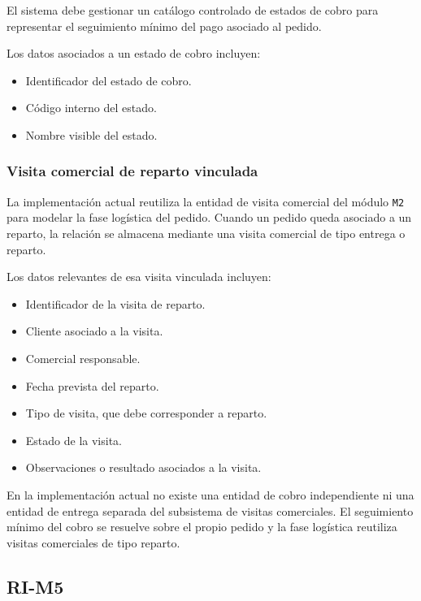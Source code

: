 El sistema debe gestionar un catálogo controlado de estados de cobro para representar el seguimiento mínimo del pago asociado al pedido.

Los datos asociados a un estado de cobro incluyen:

\begin{itemize}
    \item Identificador del estado de cobro.
    \item Código interno del estado.
    \item Nombre visible del estado.
\end{itemize}

\subsubsection*{Visita comercial de reparto vinculada}

La implementación actual reutiliza la entidad de visita comercial del módulo \texttt{M2} para modelar la fase logística del pedido. Cuando un pedido queda asociado a un reparto, la relación se almacena mediante una visita comercial de tipo entrega o reparto.

Los datos relevantes de esa visita vinculada incluyen:

\begin{itemize}
    \item Identificador de la visita de reparto.
    \item Cliente asociado a la visita.
    \item Comercial responsable.
    \item Fecha prevista del reparto.
    \item Tipo de visita, que debe corresponder a reparto.
    \item Estado de la visita.
    \item Observaciones o resultado asociados a la visita.
\end{itemize}

En la implementación actual no existe una entidad de cobro independiente ni una entidad de entrega separada del subsistema de visitas comerciales. El seguimiento mínimo del cobro se resuelve sobre el propio pedido y la fase logística reutiliza visitas comerciales de tipo reparto.
\subsection{RI-M5}

